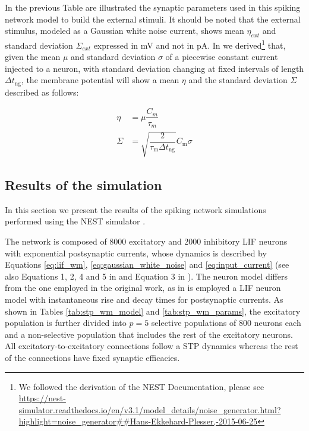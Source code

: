 \documentclass[a4paper, 12pt, twoside, openright]{book}
\begin{document}
In the previous Table are illustrated the synaptic parameters used in this spiking network model to build the external stimuli. It should be noted that the external stimulus, modeled as a Gaussian white noise current, shows mean $\eta_{ext}$ and standard deviation $\Sigma_{ext}$ expressed in mV and not in pA. In \cite{Tiddia2022_WM} we derived\footnote{We followed the derivation of the NEST Documentation, please see \url{https://nest-simulator.readthedocs.io/en/v3.1/model_details/noise_generator.html?highlight=noise_generator##Hans-Ekkehard-Plesser,-2015-06-25}} that, given the mean $\mu$ and standard deviation $\sigma$ of a piecewise constant current injected to a neuron, with standard deviation changing at fixed intervals of length $\Delta t_{\text{ng}}$, the membrane potential will show a mean $\eta$ and the standard deviation $\Sigma$ described as follows:

\begin{equation}
    \begin{split}
        \eta &= \mu \dfrac{C_m}{\tau_m} \\
        \Sigma &= \sqrt{\dfrac{2}{\tau_{\text{m}} \Delta t_{\text{ng}}}} C_{\text{m}} \sigma
    \end{split}
    \label{eq:noise_generator}
\end{equation}

\subsection{Results of the simulation}
In this section we present the results of the spiking network simulations performed using the  NEST simulator \cite{nest3.1}.

The network is composed of 8000 excitatory and 2000 inhibitory LIF neurons with exponential postsynaptic currents, whose dynamics is described by Equations \eqref{eq:lif_wm}, \eqref{eq:gaussian_white_noise} and \eqref{eq:input_current} (see also Equations 1, 2, 4 and 5 in \cite{Burkitt2006} and Equation 3 in \cite{Hanuschkin2010}). The neuron model differs from the one employed in the original work, as in \cite{Mongillo2008} is employed a LIF neuron model with instantaneous rise and decay times for postsynaptic currents. As shown in Tables \ref{tab:stp_wm_model} and \ref{tab:stp_wm_params}, the excitatory population is further divided into $p=5$ selective populations of 800 neurons each and a non-selective population that includes the rest of the excitatory neurons. All excitatory-to-excitatory connections follow a STP dynamics whereas the rest of the connections have fixed synaptic efficacies.
\end{document}
